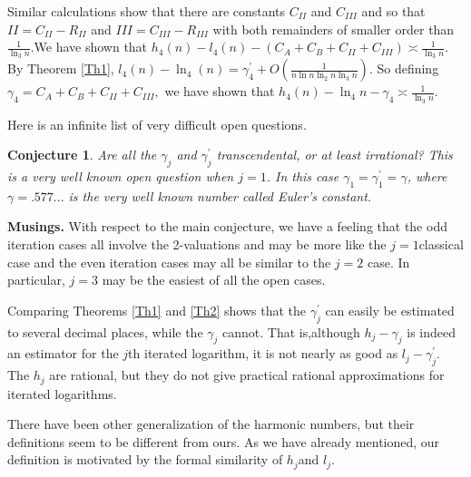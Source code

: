 \documentclass{article}
\newtheorem{conjecture}[theorem]{Conjecture}
\newenvironment{proof}[1][Proof]{}{}
\begin{document}
\begin{proof}
Similar calculations show that there are constants $C_{II}$ and $C_{III}$
and so that $II=C_{II}-R_{II}$ and $III=C_{III}-R_{III}$ with both
remainders of smaller order than $\frac{1}{\ln _{3}n}.$We have shown that $%
h_{4}\left( n\right) -l_{4}\left( n\right) -\left(
C_{A}+C_{B}+C_{II}+C_{III}\right) \asymp \frac{1}{\ln _{3}n}$. By Theorem %
\ref{Th1}, $l_{4}(n)-\ln _{4}\left( n\right) =\gamma _{4}^{\prime }+O\left( 
\frac{1}{n\ln n\ln _{2}n\ln _{3}n}\right) .$ So defining $\gamma
_{4}=C_{A}+C_{B}+C_{II}+C_{III},$ we have shown that $h_{4}\left( n\right)
-\ln _{4}n-\gamma _{4}\asymp \frac{1}{\ln _{3}n}.$
\end{proof}

Here is an infinite list of very difficult open questions. 

\begin{conjecture}
Are all the $\gamma _{j}$ and $\gamma _{j}^{\prime }$ transcendental, or at
least irrational? This is a very well known open question when $j=1$. In
this case $\gamma _{1}=\gamma _{1}^{\prime }=\gamma $, where $\gamma =.577...
$ is the very well known number called Euler's constant.
\end{conjecture}

\textbf{Musings.} With respect to the main conjecture, we have a feeling
that the odd iteration cases all involve the 2-valuations and may be more
like the $j=1$classical case and the even iteration cases may all be similar
to the $j=2$ case. In particular, $j=3$ may be the easiest of all the open
cases.

Comparing Theorems \ref{Th1} and \ref{Th2} shows that the $\gamma
_{j}^{\prime }$ can easily be estimated to several decimal places, while the 
$\gamma _{j}$ cannot. That is,although $h_{j}-\gamma _{j}$ is indeed an
estimator for the $j$th iterated logarithm, it is not nearly as good as $%
l_{j}-\gamma _{j}^{\prime }.$ The $h_{j}$ are rational, but they do not give
practical rational approximations for iterated logarithms.

There have been other generalization of the harmonic numbers, but their
definitions seem to be different from ours. As we have already mentioned,
our definition is motivated by the formal similarity of $h_{j}$and $l_{j}.$
\end{document}
